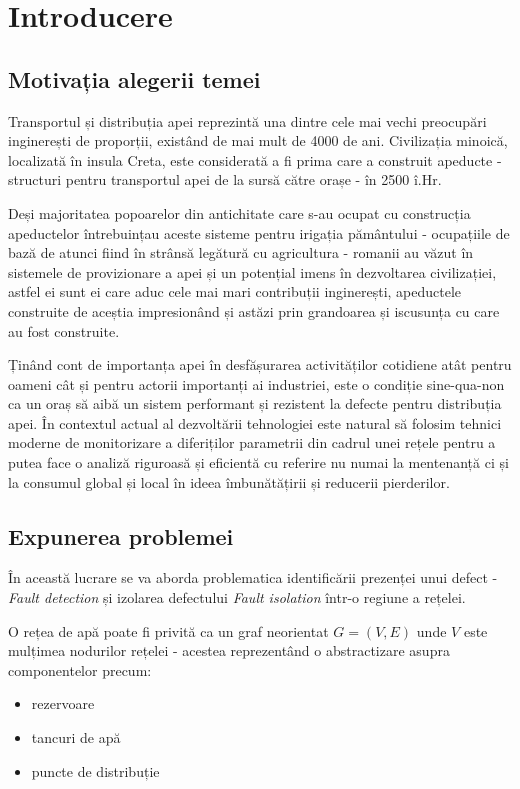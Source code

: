 \chapter{Introducere}
\label{chap:intro}

\section{Motivația alegerii temei}
Transportul și distribuția apei reprezintă una dintre cele mai vechi preocupări inginerești de proporții, existând de mai mult de 4000 de ani. Civilizația minoică, localizată în insula Creta, este considerată a fi prima care a construit apeducte - structuri pentru transportul apei de la sursă către orașe - în 2500 î.Hr. 

Deși majoritatea popoarelor din antichitate care s-au ocupat cu construcția apeductelor întrebuințau aceste sisteme pentru irigația pământului - ocupațiile de bază de atunci fiind în strânsă legătură cu agricultura - romanii au văzut în sistemele de provizionare a apei și un potențial imens în dezvoltarea civilizației, astfel ei sunt ei care aduc cele mai mari contribuții inginerești, apeductele construite de aceștia impresionând și astăzi prin grandoarea și iscusunța cu care au fost construite.

Ținând cont de importanța apei în desfășurarea activităților cotidiene atât pentru oameni cât și pentru actorii importanți ai industriei, este o condiție sine-qua-non ca un oraș să aibă un sistem performant și rezistent la defecte pentru distribuția apei. În contextul actual al dezvoltării tehnologiei este natural să folosim tehnici moderne de monitorizare a diferiților parametrii din cadrul unei rețele pentru a putea face o analiză riguroasă și eficientă cu referire nu numai la mentenanță ci și la consumul global și local în ideea îmbunătățirii și reducerii pierderilor.


\section{Expunerea problemei}

În această lucrare se va aborda problematica identificării prezenței unui defect - \textit{Fault detection} și izolarea defectului \textit{Fault isolation} într-o regiune a rețelei.

O rețea de apă poate fi privită ca un graf neorientat $G = (V, E)$ unde $V$ este mulțimea nodurilor rețelei - acestea reprezentând o abstractizare asupra componentelor precum:
\begin{itemize}
\item rezervoare
\item tancuri de apă
\item puncte de distribuție
\end{itemize} 

